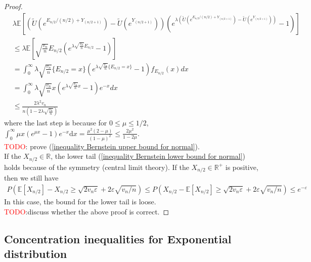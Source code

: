 \documentclass{article}
\theoremstyle{plain}
\begin{document}
\begin{proof}
\begin{align}
    & \lambda \mathbb{E}[\left(\tilde{U}\left(e^{E_{n / 2} /(n / 2)+Y_{(n / 2+1)}} \right)-\tilde{U}\left(e^{Y_{(n / 2+1)}}\right) \right) \left(e^{\lambda \left (\tilde{U}\left(e^{E_{n / 2} /(n / 2)+Y_{(n / 2+1)}} \right)-\tilde{U}\left(e^{Y_{(n / 2+1)}}\right) \right)} - 1\right)]\\
    & \leq \lambda \mathbb{E}[\sqrt{\frac{v_{n}}{n}} E_{n / 2} \left(e^{\lambda \sqrt{\frac{v_{n}}{n}} E_{n / 2}} -1\right)]\\
    & = \int_0^\infty \lambda  \sqrt{\frac{v_{n}}{n}} \{ E_{n / 2}  = x \} \left(e^{\lambda \sqrt{\frac{v_{n}}{n}} \{E_{n / 2} = x\}} -1\right) f_{E_{n/2}}(x) d x\\
    & = \int_0^\infty \lambda  \sqrt{\frac{v_{n}}{n}} x \left(e^{\lambda \sqrt{\frac{v_{n}}{n}} x } -1\right) e^{-x} d x\\
    & \leq \frac{2\lambda^2 v_n}{n (1 - 2 \lambda \sqrt{\frac{v_n}{n}})}
\end{align}
where the last step is because for $0 \leq \mu \leq 1/2$, $\int_{0}^{\infty} \mu x\left(e^{\mu x}-1\right) e^{-x} \mathrm{d} x=\frac{\mu^{2}(2-\mu)}{(1-\mu)^{2}} \leq \frac{2 \mu^{2}}{1-2 \mu}$.\\

\textcolor{red}{TODO}: prove (\ref{inequality Bernstein upper bound for normal}).\\

If the $X_{n/2} \in \mathbb{R}$, the lower tail (\ref{inequality Bernstein lower bound for normal}) holds because of the symmetry (central limit theory). If the $X_{n/2} \in \mathbb{R^+}$ is positive, then we still have 
\begin{align}
    P\left( \mathbb{E}[ X_{n/2}] - X_{n/2} \geq \sqrt{2v_n \varepsilon} + 2 \varepsilon \sqrt{v_n/n} \right) \leq P\left( X_{n/2}-\mathbb{E}[ X_{n/2}] \geq \sqrt{2v_n \varepsilon} + 2 \varepsilon \sqrt{v_n/n} \right) \leq e^{-\varepsilon}
\end{align}
In this case, the bound for the lower tail is loose.\\ 

\textcolor{red}{TODO}:discuss whether the above proof is correct. 
\end{proof}


\subsection{Concentration inequalities for Exponential distribution}
\end{document}
